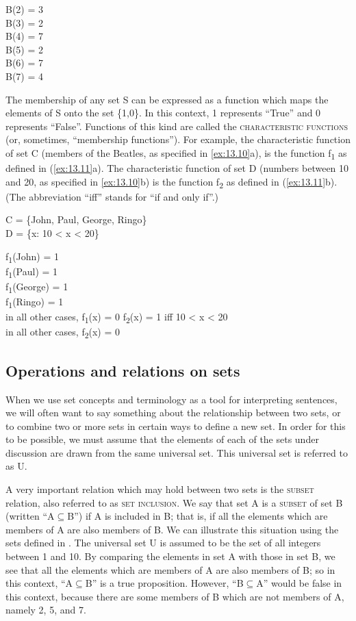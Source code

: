 \ea \label{ex:13.9}
B(2) = 3\\
B(3) = 2\\
B(4) = 7\\
B(5) = 2\\
B(6) = 7\\
B(7) = 4
\z


The membership of any set S can be expressed as a function which maps the elements of S onto the set \{1,0\}. In this context, 1 represents “True” and 0 represents “False”. Functions of this kind are called the \textsc{characteristic functions} (or, sometimes, “membership functions”). For example, the characteristic function of set C (members of the Beatles, as specified in \ref{ex:13.10}a), is the function f\textsubscript{1} as defined in (\ref{ex:13.11}a). The characteristic function of set D (numbers between 10 and 20, as specified in \ref{ex:13.10}b) is the function f\textsubscript{2} as defined in (\ref{ex:13.11}b). (The abbreviation “iff” stands for “if and only if”.)


\ea \label{ex:13.10}
\ea  C = \{John, Paul, George, Ringo\}\\
\ex D = \{x: 10 < x < 20\}
                       \z
\z

\ea \label{ex:13.11}
\ea  f\textsubscript{1}(John) = 1\\
f\textsubscript{1}(Paul) = 1\\
f\textsubscript{1}(George) = 1\\
f\textsubscript{1}(Ringo) = 1\\
in all other cases, f\textsubscript{1}(x) = 0
\ex f\textsubscript{2}(x) = 1 iff 10 < x < 20\\
in all other cases, f\textsubscript{2}(x) = 0
\z \z

\subsection{Operations and relations on sets}\label{sec:13.3.2}

When we use set concepts and terminology as a tool for interpreting sentences, we will often want to say something about the relationship between two sets, or to combine two or more sets in certain ways to define a new set. In order for this to be possible, we must assume that the elements of each of the sets under discussion are drawn from the same universal set. This universal set is referred to as U.



A very important relation which may hold between two sets is the \textsc{subset} relation, also referred to as \textsc{set} \textsc{inclusion}. We say that set A is a \textsc{subset} of set B (written “A${\subseteq}$B”) if A is included in B; that is, if all the elements which are members of A are also members of B. We can illustrate this situation using the sets defined in . The universal set U is assumed to be the set of all integers between 1 and 10. By comparing the elements in set A with those in set B, we see that all the elements which are members of A are also members of B; so in this context, “A${\subseteq}$B” is a true proposition. However, “B${\subseteq}$A” would be false in this context, because there are some members of B which are not members of A, namely 2, 5, and 7.



